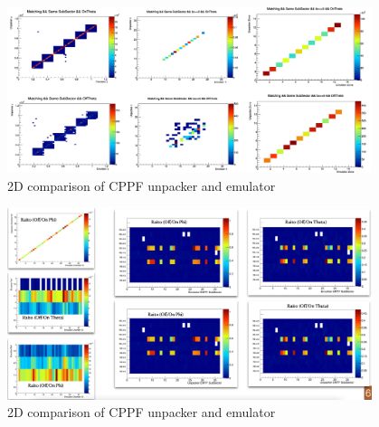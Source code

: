\begin{figure}[htb]
  \centering
  \includegraphics[width=0.95\textwidth]{Images/CPPF/CPPF_UnpEmu_Comparison_13.png}
\caption{2D comparison of CPPF unpacker and emulator} \label{fig:CPPF_unpacker_emulator_comparison_2}
\end{figure}

\begin{figure}[htb]
  \centering
  \includegraphics[width=0.95\textwidth]{Images/CPPF/CPPF_UnpEmu_Comparison_28.png}
\caption{2D comparison of CPPF unpacker and emulator} \label{fig:CPPF_unpacker_emulator_comparison_3}
\end{figure}